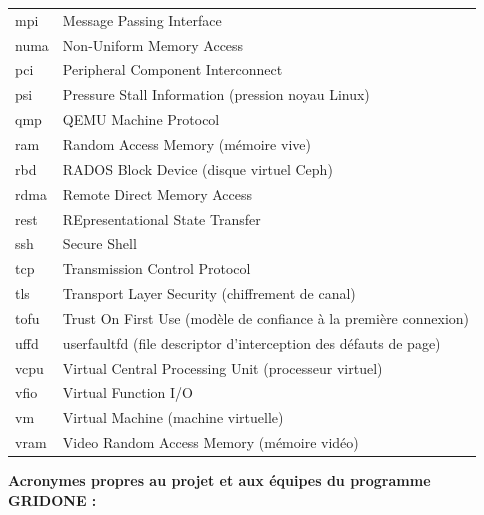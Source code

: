 \documentclass[
    language=french,
    school=estg,
    docstage=final,
    media=paper,
    bookprint=false,
    linkcolor=red!45!black,
    chapterstyle=classic,
    coverstyle=classic,
    aiacknowledgement=false,
    listprefix=false
]{IPLeiriaThesis}
\theoremstyle{definition}
\theoremstyle{plain}
\begin{document}
\begin{longtable}{lp{11cm}}
\acrshort{mpi}    & Message Passing Interface \\
\acrshort{numa}   & Non-Uniform Memory Access \\
\acrshort{pci}    & Peripheral Component Interconnect \\
\acrshort{psi}    & Pressure Stall Information (pression noyau Linux) \\
\acrshort{qmp}    & QEMU Machine Protocol \\
\acrshort{ram}    & Random Access Memory (mémoire vive) \\
\acrshort{rbd}    & RADOS Block Device (disque virtuel Ceph) \\
\acrshort{rdma}   & Remote Direct Memory Access \\
\acrshort{rest}   & REpresentational State Transfer \\
\acrshort{ssh}    & Secure Shell \\
\acrshort{tcp}    & Transmission Control Protocol \\
\acrshort{tls}    & Transport Layer Security (chiffrement de canal) \\
\acrshort{tofu}   & Trust On First Use (modèle de confiance à la première connexion) \\
\acrshort{uffd}   & userfaultfd (file descriptor d'interception des défauts de page) \\
\acrshort{vcpu}   & Virtual Central Processing Unit (processeur virtuel) \\
\acrshort{vfio}   & Virtual Function I/O \\
\acrshort{vm}     & Virtual Machine (machine virtuelle) \\
\acrshort{vram}   & Video Random Access Memory (mémoire vidéo) \\
\bottomrule
\end{longtable}

\noindent\textbf{Acronymes propres au projet et aux équipes du programme GRIDONE :}
\end{document}
